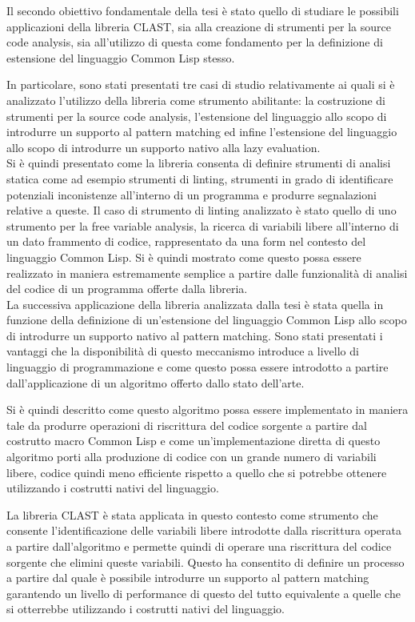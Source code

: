 \documentclass{book}
\begin{document}
Il secondo obiettivo fondamentale della tesi è stato quello di studiare le
possibili applicazioni della libreria CLAST, sia alla creazione di strumenti per
la source code analysis, sia all'utilizzo di questa come fondamento per la
definizione di estensione del linguaggio Common Lisp stesso.

In particolare, sono stati presentati tre casi di studio relativamente ai quali
si è analizzato l'utilizzo della libreria come strumento abilitante: la
costruzione di strumenti per la source code analysis, l'estensione del
linguaggio allo scopo di introdurre un supporto al pattern matching ed infine
l'estensione del linguaggio allo scopo di introdurre un supporto nativo alla
lazy evaluation.\\

Si è quindi presentato come la libreria consenta di definire strumenti di
analisi statica come ad esempio strumenti di linting, strumenti in grado di
identificare potenziali inconistenze all'interno di un programma e produrre
segnalazioni relative a queste. Il caso di strumento di linting analizzato è
stato quello di uno strumento per la free variable analysis, la ricerca di
variabili libere all'interno di un dato frammento di codice, rappresentato da
una form nel contesto del linguaggio Common Lisp. Si è quindi mostrato come
questo possa essere realizzato in maniera estremamente semplice a partire dalle
funzionalità di analisi del codice di un programma offerte dalla libreria.\\

La successiva applicazione della libreria analizzata dalla tesi è stata quella
in funzione della definizione di un'estensione del linguaggio Common Lisp allo
scopo di introdurre un supporto nativo al pattern matching. Sono stati
presentati i vantaggi che la disponibilità di questo meccanismo introduce a
livello di linguaggio di programmazione e come questo possa essere introdotto a
partire dall'applicazione di un algoritmo offerto dallo stato dell'arte.

Si è quindi descritto come questo algoritmo possa essere implementato in maniera
tale da produrre operazioni di riscrittura del codice sorgente a partire dal
costrutto macro Common Lisp e come un'implementazione diretta di questo
algoritmo porti alla produzione di codice con un grande numero di variabili
libere, codice quindi meno efficiente rispetto a quello che si potrebbe ottenere
utilizzando i costrutti nativi del linguaggio.

La libreria CLAST è stata applicata in questo contesto come strumento che
consente l'identificazione delle variabili libere introdotte dalla riscrittura
operata a partire dall'algoritmo e permette quindi di operare una riscrittura
del codice sorgente che elimini queste variabili. Questo ha consentito di
definire un processo a partire dal quale è possibile introdurre un supporto al
pattern matching garantendo un livello di performance di questo del tutto
equivalente a quelle che si otterrebbe utilizzando i costrutti nativi del
linguaggio.\\
\end{document}
